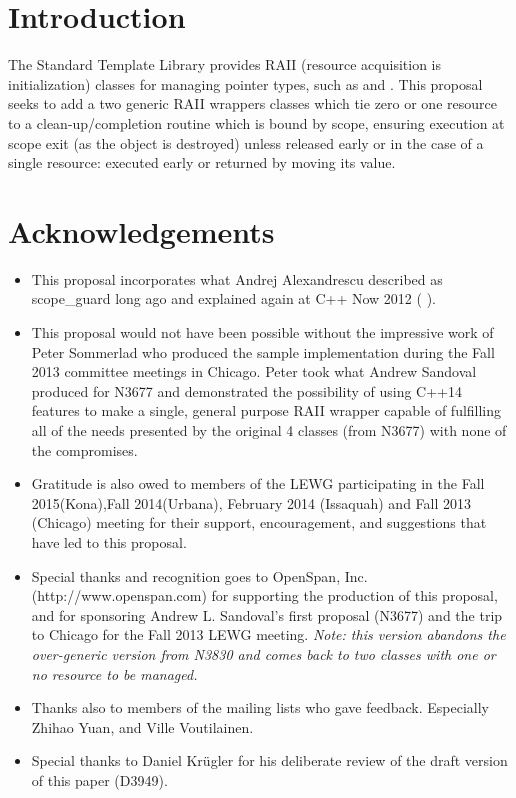 \documentclass[ebook,11pt,article]{memoir}
\begin{document}
\chapter{Introduction}
The Standard Template Library provides RAII (resource acquisition is initialization) classes for managing pointer types, such as  and .  This proposal seeks to add a two generic RAII wrappers classes which tie zero or one resource to a clean-up/completion routine which is bound by scope, ensuring execution at scope exit (as the object is destroyed) unless released early or in the case of a single resource: executed early or returned by moving its value.

\chapter{Acknowledgements}
\begin{itemize}
\item This proposal incorporates what Andrej Alexandrescu described as scope_guard long ago and explained again at C++ Now 2012 (%
).
\item This proposal would not have been possible without the impressive work of Peter Sommerlad who produced the sample implementation during the Fall 2013 committee meetings in Chicago.  Peter took what Andrew Sandoval produced for N3677 and demonstrated the possibility of using C++14 features to make a single, general purpose RAII wrapper capable of fulfilling all of the needs presented by the original 4 classes (from N3677) with none of the compromises.
\item Gratitude is also owed to members of the LEWG participating in the Fall 2015(Kona),Fall 2014(Urbana), February 2014 (Issaquah) and Fall 2013 (Chicago) meeting for their support, encouragement, and suggestions that have led to this proposal.
\item Special thanks and recognition goes to OpenSpan, Inc. (http://www.openspan.com) for supporting the production of this proposal, and for sponsoring Andrew L. Sandoval's first proposal (N3677) and the trip to Chicago for the Fall 2013 LEWG meeting. \emph{Note: this version abandons the over-generic version from N3830 and comes back to two classes with one or no resource to be managed.}
\item Thanks also to members of the mailing lists who gave feedback. Especially Zhihao Yuan, and Ville Voutilainen.
\item Special thanks to Daniel Kr\"ugler for his deliberate review of the draft version of this paper (D3949).
\end{itemize}
\end{document}

